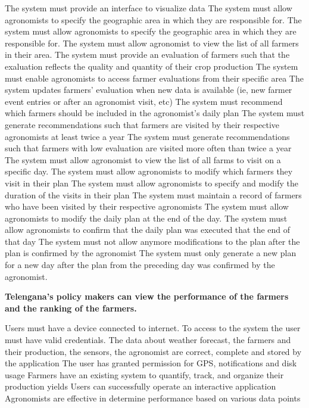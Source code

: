\begin{itemize}
\begin{itemize}
 The system must provide an interface to visualize data
 The system must allow agronomists to specify the geographic area in which they are responsible for.
 The system must allow agronomists to specify the geographic area in which they are responsible for.
  The system must allow agronomist to view the list of all farmers in their area.
  The system must provide an evaluation of farmers such that the exaluation reflects the quality and quantity of their crop production
  The system must enable agronomists to access farmer evaluations from their specific area
  The system updates farmers' evaluation when new data is available (ie, new farmer event entries or after an agronomist visit, etc)
  The system must recommend which farmers should be included in the agronomist's daily plan
  The system must generate recommendations such that farmers are visited by their respective agronomists at least twice a year
  The system must generate recommendations such that farmers with low evaluation are visited more often than twice a year
  The system must allow agronomist to view the list of all farms to visit on a specific day.
  The system must allow agronomists to modify which farmers they visit in their plan
  The system must allow agronomists to specify and modify the duration of the visits in their plan
  The system must maintain a record of farmers who have been visited by their respective agronomists
 The system must allow agronomists to modify the daily plan at the end of the day.
 The system must allow agronomists to confirm that the daily plan was executed that the end of that day
 The system must not allow anymore modifications to the plan after the plan is confirmed by the agronomist
 The system must only generate a new plan for a new day after the plan from the preceding day was confirmed by the agronomist.
\end{itemize}

 \textbf{Telengana’s policy makers can view the performance of the farmers and the ranking of the farmers.}
\begin{itemize}
  Users must have a device connected to internet.
 To access to the system the user must have valid credentials.
 The data about weather forecast, the farmers and their production, the sensors, the agronomist are correct, complete and stored by the application
 The user has granted permission for GPS, notifications and disk usage
 Farmers have an existing system to quantify, track, and organize their production yields
 Users can successfully operate an interactive application
 Agronomists are effective in determine performance based on various data points



\end{itemize}
\end{itemize}
